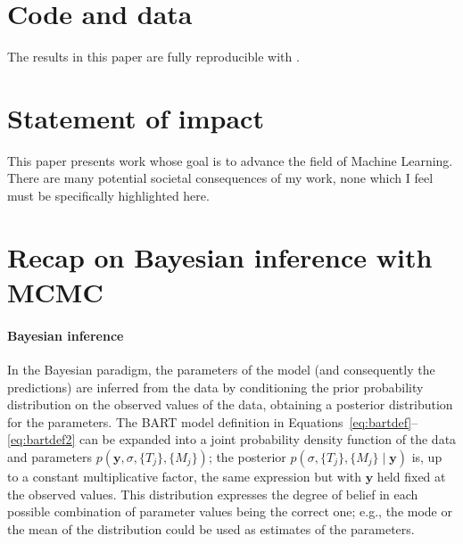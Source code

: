 \documentclass{article}
\begin{document}
    \section*{Code and data}

    The results in this paper are fully reproducible with
    \citet{petrillo2025}.


    \section*{Statement of impact}

    This paper presents work whose goal is to advance the field of Machine Learning. There are many potential societal consequences of my work, none which I feel must be specifically highlighted here.




\clearpage
\appendix

    \section{Recap on Bayesian inference with MCMC}
    \label{sec:bayesrecap}

    \paragraph{Bayesian inference}

    In the Bayesian paradigm, the parameters of the model (and consequently the predictions) are inferred from the data by conditioning the prior probability distribution on the observed values of the data, obtaining a posterior distribution for the parameters. The BART model definition in Equations~\ref{eq:bartdef}--\ref{eq:bartdef2} can be expanded into a joint probability density function of the data and parameters $p(\mathbf y, \sigma, \{T_j\}, \{M_j\})$; the posterior $p(\sigma, \{T_j\}, \{M_j\}\mid \mathbf y)$ is, up to a constant multiplicative factor, the same expression but with $\mathbf y$ held fixed at the observed values. This distribution expresses the degree of belief in each possible combination of parameter values being the correct one; e.g., the mode or the mean of the distribution could be used as estimates of the parameters.
\end{document}
